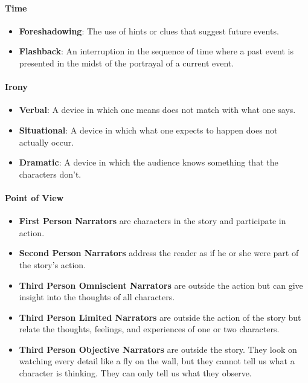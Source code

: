 
\paragraph{Time}
\label{par:time}

\begin{itemize}
  \label{item:time}

  \item \textbf{Foreshadowing}: The use of hints or clues that suggest future
    events.
  \item \textbf{Flashback}: An interruption in the sequence of time where a past
    event is presented in the midst of the portrayal of a current event.
\end{itemize}


\paragraph{Irony}
\label{par:irony}

\begin{itemize}
  \label{item:irony}

  \item \textbf{Verbal}: A device in which one means does not match with what
    one says.
  \item \textbf{Situational}: A device in which what one expects to happen does
    not actually occur.
  \item \textbf{Dramatic}: A device in which the audience knows something that
    the characters don't.
\end{itemize}


\paragraph{Point of View}
\label{par:point_of_view}

\begin{itemize}
  \label{item:point_of_view}

  \item \textbf{First Person Narrators} are characters in the story and
    participate in action.
  \item \textbf{Second Person Narrators} address the reader as if he or she were
    part of the story's action.
  \item \textbf{Third Person Omniscient Narrators} are outside the action but
    can give insight into the thoughts of all characters.
  \item \textbf{Third Person Limited Narrators} are outside the action of the
    story but relate the thoughts, feelings, and experiences of one or two
    characters.
  \item \textbf{Third Person Objective Narrators} are outside the story. They
    look on watching every detail like a fly on the wall, but they cannot tell
    us what a character is thinking. They can only tell us what they observe.
\end{itemize}

